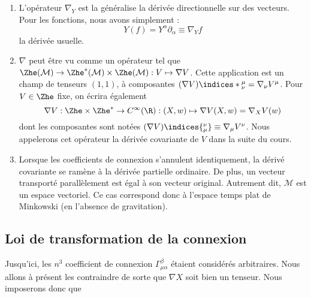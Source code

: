 \begin{enumerate}
    \item L'opérateur $\nabla_{Y}$ est la généralise la dérivée directionnelle sur des vecteurs. Pour les fonctions, nous avons simplement :
    \begin{equation}
        Y(f) = Y^{\alpha}\partial_{\alpha} \equiv \nabla_{Y}f
    \end{equation}
    la dérivée usuelle.
    \item $\nabla$ peut être vu comme un opérateur tel que
    $\Zhe (\mathcal{M})\to \Zhe^* (\mathcal{M})\times\Zhe(\mathcal{M}):V \mapsto \nabla V$. Cette application est un champ de tenseurs $(1, 1)$, à composantes $(\nabla V)\indices*{^\mu_\nu} = \nabla_\nu V^\mu$. Pour $V\in\Zhe$ fixe, on écrira également
    \begin{equation}
        \nabla V: \Zhe \times \Zhe^* \to C^\infty(\R): (X,w) \mapsto \nabla V(X,w) = \nabla_X V(w)
    \end{equation}
    dont les composantes sont notées $(\nabla V)\indices{_\mu^\nu} \equiv \nabla_\mu V^\nu$. Nous appelerons cet opérateur la dérivée covariante de $V$ dans la suite du cours.
    \item Lorsque les coefficients de connexion s'annulent identiquement, la dérivé covariante se ramène à la dérivée partielle ordinaire. De plus, un vecteur transporté parallèlement est égal à son vecteur original. Autrement dit, $\mathcal{M}$ est un espace vectoriel. Ce cas correspond donc à l'espace temps plat de Minkowski (en l'absence de gravitation).
\end{enumerate}

\subsection{Loi de transformation de la connexion}

Jusqu'ici, les $n^3$ coefficient de connexion $\Gamma^{\beta}_{\mu \alpha}$ étaient considérés arbitraires. Nous allons à présent les contraindre de sorte que $\nabla X$ soit bien un tenseur. Nous imposerons donc que

